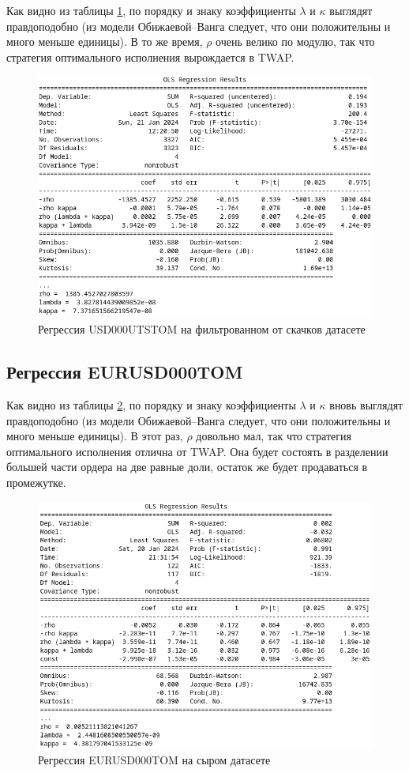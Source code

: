 Как видно из таблицы \ref{usdrubregr}, по порядку и знаку коэффициенты $\lambda$ и $\kappa$ выглядят правдоподобно
(из модели Обижаевой--Ванга следует, что они положительны и много меньше единицы).
В то же время, $\rho$ очень велико по модулю, так что стратегия оптимального исполнения
вырождается в TWAP. 
\begin{figure}
    \includegraphics[scale=0.8]{fig/USDRUBregr.png}
    \caption{Регрессия USD000UTSTOM на фильтрованном от скачков датасете}
    \label{usdrubregr}
\end{figure}

\subsection{Регрессия EURUSD000TOM}

Как видно из таблицы \ref{usdeurregr}, по порядку и знаку коэффициенты $\lambda$ и $\kappa$ вновь 
выглядят правдоподобно
(из модели Обижаевой--Ванга следует, что они положительны и много меньше единицы).
В этот раз, $\rho$ довольно мал, так что стратегия оптимального исполнения
отлична от TWAP. Она будет состоять в разделении большей части ордера на две равные доли,
остаток же будет продаваться в промежутке. 

\begin{figure}
    \includegraphics[scale=0.8]{fig/EURUSDregr.png}
    \caption{Регрессия EURUSD000TOM на сыром датасете}
    \label{usdeurregr}
\end{figure}


